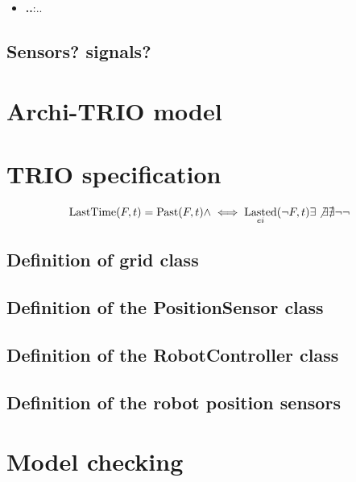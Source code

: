 \documentclass[a4paper]{article}
\newcommand{\liff}{\iff}
\DeclareMathOperator{\past}{Past}
\DeclareMathOperator{\lastedOp}{Lasted}
\newcommand{\lasted}{\lastedOp_{ei}}
\DeclareMathOperator{\lasttime}{LastTime}
\begin{document}
\begin{itemize}
    \item \textbf{..}:\@ ..
\end{itemize}

\subsection{Sensors? signals?}
\clearpage
\section{Archi-TRIO model}




\clearpage
\section{TRIO specification}
\begin{equation*}
\lasttime(F, t) = \past(F, t) \land \liff \lasted(\lnot F, t)
\exists 
\not\exists
\nexists
\neg
\lnot
\end{equation*}


\subsection{Definition of grid class}


\pagebreak
\subsection{Definition of the PositionSensor class}


\pagebreak
\subsection{Definition of the  RobotController class}




\pagebreak
\subsection{Definition of the robot position sensors}



\section{Model checking}
\end{document}
